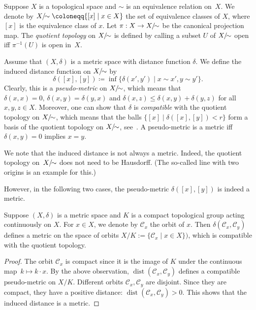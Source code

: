 \documentclass[a4paper,USenglish,cleveref,numberwithinsect]{lipics-v2021}
\DeclareMathOperator{\dist}{dist}
\newcommand{\KK}{\ensuremath{\mathcal{C}}}
\newcommand{\Xquot}{X/\hspace{-1ex}\sim}
\numberwithin{equation}{section}
\begin{document}
\begin{definition}
Suppose $X$ is a topological space and $\sim$ is an equivalence relation on~$X$.
We denote by $\Xquot\coloneqq\{[x]\mid x\in X\}$ the set of equivalence classes of $X$,
where $[x]$ is the equivalence class of $x$. Let $\pi:X\rightarrow \Xquot$ be the canonical projection map.
The \textit{quotient topology} on $\Xquot$ is defined by calling
a subset $U$ of $\Xquot$ open iff $\pi^{-1}(U)$ is open in~$X$.
\end{definition}

Assume that $(X,\delta)$ is a metric space with distance function $\delta$.
We define the induced distance function on $\Xquot$ by
\[
\delta([x],[y]) \coloneqq \inf\{\delta (x',y')\mid x\sim x', y\sim y'\} .
\]
Clearly, this is a \textit{pseudo-metric} on $\Xquot$, which means that
$\delta(x,x)=0, \, \delta(x,y)=\delta(y,x)$
and $\delta(x,z)\leq\delta(x,y)+\delta(y,z)$ for all $x,y,z\in X$.
Moreover, one can show that $\delta$ is \textit{compatible}
with the quotient topology on $\Xquot$,
which means that the balls
$\{ [x] \mid \delta([x],[y]) < r \}$
form a basis of the quotient topology on $\Xquot$,
see~\cite[Theorem~4]{himmelberg}.
A pseudo-metric is a metric iff $\delta(x,y)=0$ implies $x=y$.

We note that the induced distance is not always a metric.
Indeed, the quotient topology on~$\Xquot$ does not need to be Hausdorff.
(The so-called line with two origins is an example for this.)

However, in the following two cases,
the pseudo-metric $\delta([x],[y])$ is indeed a metric.

\begin{proposition}
\label{prop:compact-quot}
Suppose $(X,\delta)$ is a metric space and $K$ is a compact topological group
acting continuously on $X$. %
For $x\in X$, we denote by $\KK_x$ the orbit of $x$.
Then $\delta(\KK_x, \KK_y)$ defines a metric on the space of orbits
$X/K := \{ \KK_x \mid x\in X \})$,
which is compatible with the quotient topology.
\end{proposition}

\begin{proof}
The orbit $\KK_x$ is compact since it is the image of $K$ under the continuous map~$k\mapsto k\cdot x$.
By the above observation, $\dist(\KK_x,\KK_y)$ defines a compatible pseudo-metric on $X/K$.
Different orbits $\KK_x,\KK_y$ are disjoint. Since they are compact, they have a positive distance:
$\dist(\KK_x,\KK_y)>0$.
This shows that the induced distance is a metric.
\end{proof}
\end{document}
